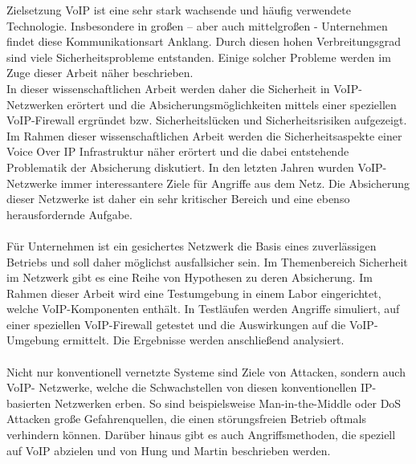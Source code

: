 \label{Zielsetzung}
\begin{section}{Zielsetzung}	
		\ac{VoIP} ist eine sehr stark wachsende und häufig verwendete Technologie.
		Insbesondere in großen – aber auch mittelgroßen - Unternehmen findet diese Kommunikationsart Anklang.
		Durch diesen hohen Verbreitungsgrad sind viele Sicherheitsprobleme entstanden.
		Einige solcher Probleme werden im Zuge dieser Arbeit näher beschrieben.\\
		
		In dieser wissenschaftlichen Arbeit werden daher die Sicherheit in VoIP-Netzwerken erörtert 
		und die Absicherungsmöglichkeiten mittels einer speziellen VoIP-Firewall ergründet bzw. 
		Sicherheitslücken und Sicherheitsrisiken aufgezeigt.
	\\
		Im Rahmen dieser wissenschaftlichen Arbeit werden die Sicherheitsaspekte einer 
		Voice Over IP Infrastruktur näher erörtert und die dabei entstehende Problematik der Absicherung diskutiert.
		In den letzten Jahren wurden VoIP-Netzwerke immer interessantere Ziele für Angriffe aus dem Netz.
		Die Absicherung dieser Netzwerke ist daher ein sehr kritischer Bereich und eine ebenso herausfordernde Aufgabe.\\
	\\
		Für Unternehmen ist ein gesichertes Netzwerk die Basis eines zuverlässigen Betriebs und 
		soll daher möglichst ausfallsicher sein.
		Im Themenbereich Sicherheit im Netzwerk gibt es eine Reihe von Hypothesen zu deren Absicherung.
	 	Im Rahmen dieser Arbeit wird eine Testumgebung in einem Labor eingerichtet, 
		welche VoIP-Komponenten enthält. In Testläufen werden Angriffe simuliert, 
		auf einer speziellen VoIP-Firewall getestet und die Auswirkungen auf die VoIP-Umgebung ermittelt.
		Die Ergebnisse werden anschließend analysiert.\\
	\\
		Nicht nur konventionell vernetzte Systeme sind Ziele von Attacken, sondern auch VoIP- Netzwerke,
		welche die Schwachstellen von diesen konventionellen IP-basierten Netzwerken erben.
		So sind beispielsweise Man-in-the-Middle oder \ac{DoS} 
		Attacken große Gefahrenquellen, die einen störungsfreien Betrieb oftmals verhindern können. 
		Darüber hinaus gibt es auch Angriffsmethoden, die speziell auf VoIP 
		abzielen und von Hung und Martin \cite{Hung:2006:seciss} beschrieben werden.
		\\ 

\end{section}
\pagebreak

